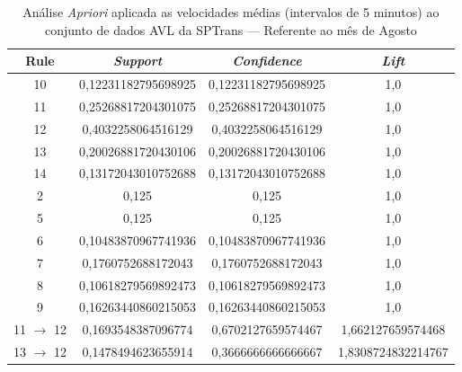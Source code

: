 \documentclass[
	12pt,				%
	oneside,			%
	a4paper,			%
	english,			%
	brazil				%
	]{abntex2ppgsi}
\begin{document}
{{\begin{apendicesenv}
\begin{table}[!htb]
\centering
\caption {Análise \textit{Apriori} aplicada as velocidades médias (intervalos de 5 minutos) ao conjunto de dados AVL da SPTrans --- Referente ao mês de Agosto}
\label {tab:aprioriAugust}
\begin{tabular}{c|c|c|c}
\hline
\textbf{Rule} & \textit{\textbf{Support}} & \textit{\textbf{Confidence}} & \textit{\textbf{Lift}} \\
\hline
10 &  0,12231182795698925 &  0,12231182795698925 &  1,0\\
\hline
11 &  0,25268817204301075 &  0,25268817204301075 &  1,0\\
\hline
12 &  0,4032258064516129 &  0,4032258064516129 &  1,0\\
\hline
13 &  0,20026881720430106 &  0,20026881720430106 &  1,0\\
\hline
14 &  0,13172043010752688 &  0,13172043010752688 &  1,0\\
\hline
2 &  0,125 &  0,125 &  1,0\\
\hline
5 &  0,125 &  0,125 &  1,0\\
\hline
6 &  0,10483870967741936 &  0,10483870967741936 &  1,0\\
\hline
7 &  0,1760752688172043 &  0,1760752688172043 &  1,0\\
\hline
8 &  0,10618279569892473 &  0,10618279569892473 &  1,0\\
\hline
9 &  0,16263440860215053 &  0,16263440860215053 &  1,0\\
\hline
11 $\rightarrow$ 12 &  0,1693548387096774 &  0,6702127659574467 &  1,662127659574468\\
\hline
13 $\rightarrow$ 12 &  0,1478494623655914 &  0,3666666666666667 &  1,8308724832214767\\
\hline
\end{tabular}
\end{table}


\end{apendicesenv}}}
\end{document}
